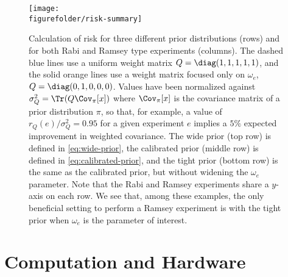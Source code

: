 \documentclass[aps,nofootinbib,twocolumn,superscriptaddress]{revtex4}
\newcommand{\figurefolder}{../fig}
\newcommand{\mps}{x}
\newcommand{\eps}{e}
\begin{document}
\begin{figure}
    \texttt{[image: \\figurefolder/risk-summary]}
    \caption{Calculation of risk for three different prior distributions (rows)
        and for both Rabi and Ramsey type experiments (columns).
        The dashed blue lines use a uniform weight matrix $Q=\diag(1,1,1,1,1)$,
        and the solid orange lines use a weight matrix focused only on $\omega_e$,
        $Q=\diag(0,1,0,0,0)$.
        Values have been normalized against $\sigma_Q^2=\Tr(Q\Cov_{\pi}[\mps])$
        where $\Cov_{\pi}[\mps]$ is the covariance matrix of a prior 
        distribution $\pi$, 
        so that, for example, a value of $r_Q(\eps)/\sigma_Q^2=0.95$ for a given 
        experiment $\eps$
        implies a $5\%$ expected improvement in weighted covariance.
        The wide prior (top row) is defined in \autoref{eq:wide-prior}, the
        calibrated prior (middle row) is defined in \autoref{eq:calibrated-prior}, 
        and the tight prior (bottom row) is the same as the calibrated prior, but 
        without widening the $\omega_e$ parameter.
        Note that the Rabi and Ramsey experiments share a $y$-axis on each row.
        We see that, among these examples, the only beneficial setting to 
        perform a Ramsey experiment is with the tight prior when $\omega_e$ 
        is the parameter of interest.
        }
    \label{fig:risk-summary}
\end{figure}

\section{Computation and Hardware}
\label{sec:computation-and-hardware}
\end{document}
